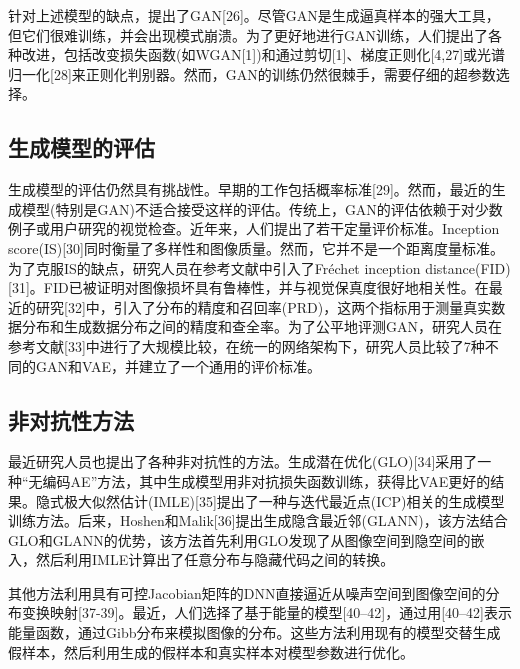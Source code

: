 针对上述模型的缺点，提出了GAN[26]。尽管GAN是生成逼真样本的强大工具，但它们很难训练，并会出现模式崩溃。为了更好地进行GAN训练，人们提出了各种改进，包括改变损失函数(如WGAN[1])和通过剪切[1]、梯度正则化[4,27]或光谱归一化[28]来正则化判别器。然而，GAN的训练仍然很棘手，需要仔细的超参数选择。

\subsection{生成模型的评估}

生成模型的评估仍然具有挑战性。早期的工作包括概率标准[29]。然而，最近的生成模型(特别是GAN)不适合接受这样的评估。传统上，GAN的评估依赖于对少数例子或用户研究的视觉检查。近年来，人们提出了若干定量评价标准。Inception score(IS)[30]同时衡量了多样性和图像质量。然而，它并不是一个距离度量标准。为了克服IS的缺点，研究人员在参考文献中引入了Fréchet inception distance(FID)[31]。FID已被证明对图像损坏具有鲁棒性，并与视觉保真度很好地相关性。在最近的研究[32]中，引入了分布的精度和召回率(PRD)，这两个指标用于测量真实数据分布和生成数据分布之间的精度和查全率。为了公平地评测GAN，研究人员在参考文献[33]中进行了大规模比较，在统一的网络架构下，研究人员比较了7种不同的GAN和VAE，并建立了一个通用的评价标准。

\subsection{非对抗性方法}

最近研究人员也提出了各种非对抗性的方法。生成潜在优化(GLO)[34]采用了一种“无编码AE”方法，其中生成模型用非对抗损失函数训练，获得比VAE更好的结果。隐式极大似然估计(IMLE)[35]提出了一种与迭代最近点(ICP)相关的生成模型训练方法。后来，Hoshen和Malik[36]提出生成隐含最近邻(GLANN)，该方法结合GLO和GLANN的优势，该方法首先利用GLO发现了从图像空间到隐空间的嵌入，然后利用IMLE计算出了任意分布与隐藏代码之间的转换。


其他方法利用具有可控Jacobian矩阵的DNN直接逼近从噪声空间到图像空间的分布变换映射[37-39]。最近，人们选择了基于能量的模型[40–42]，通过用[40–42]表示能量函数，通过Gibb分布来模拟图像的分布。这些方法利用现有的模型交替生成假样本，然后利用生成的假样本和真实样本对模型参数进行优化。